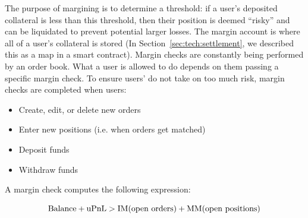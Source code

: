 \documentclass{article}
\begin{document}
The purpose of margining is to determine a threshold: if a user's deposited collateral is less than this threshold, then their position is deemed ``risky'' and can be liquidated to prevent potential larger losses. 
The margin account is where all of a user's collateral is stored (In Section~\ref{sec:tech:settlement}, we described this as a map in a smart contract). Margin checks are constantly being performed by an order book. What a user is allowed to do depends on them passing a specific margin check. To ensure users' do not take on too much risk, margin checks are completed when users:
\begin{itemize}
    \item Create, edit, or delete new orders
    \item Enter new positions (i.e. when orders get matched)
    \item Deposit funds
    \item Withdraw funds
\end{itemize}

\noindent A margin check computes the following expression:

\begin{equation}
    \textup{Balance} + \textup{uPnL} > \textup{IM}(\textup{open orders}) + \textup{MM}(\textup{open positions})
    \label{eq:margincheck}
\end{equation} 
\end{document}
